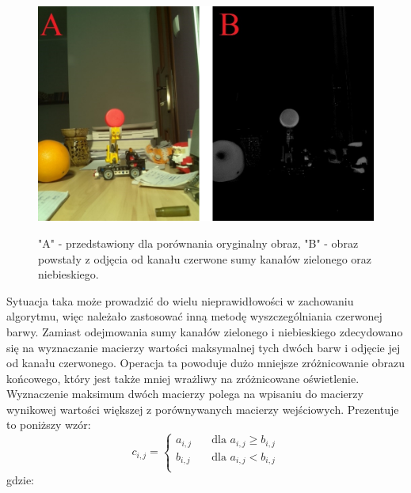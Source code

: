 \begin{figure}[H]
\begin{center}
\includegraphics[scale=0.42]{imgs/imgBase+sumBG.jpg}
\caption[Kanał czerwony minus zielony oraz niebieski.]\small{"A" - przedstawiony dla porównania oryginalny obraz, "B" - obraz powstały z odjęcia od kanału czerwone sumy kanałów zielonego oraz niebieskiego.}
\label{red-b+g}
\end{center}
\end{figure}
Sytuacja taka może prowadzić do wielu nieprawidłowości w zachowaniu algorytmu, więc należało zastosować inną metodę wyszczególniania czerwonej barwy. Zamiast odejmowania sumy kanałów zielonego i niebieskiego zdecydowano się na wyznaczanie macierzy wartości maksymalnej tych dwóch barw i odjęcie jej od kanału czerwonego. Operacja ta powoduje dużo mniejsze zróżnicowanie obrazu końcowego, który jest także mniej wrażliwy na zróżnicowane oświetlenie. Wyznaczenie maksimum dwóch macierzy polega na wpisaniu do macierzy wynikowej wartości większej z porównywanych macierzy wejściowych. Prezentuje to poniższy wzór:
\begin{equation}
c_{i,j} =
  \begin{cases}
    a_{i,j}	& \quad \text{dla } a_{i,j} \geq b_{i,j}\\
    b_{i,j}	& \quad \text{dla } a_{i,j} < b_{i,j}\\
  \end{cases}
\label{eq:progowanie}
\end{equation}
gdzie:
\begin{equationDescriptor}
\end{equationDescriptor}
